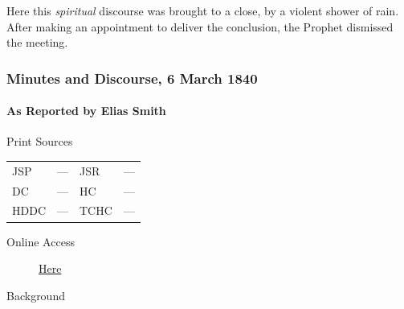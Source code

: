 				Here this \textit{spiritual} discourse was brought to a close, by a violent shower of rain. After making an appointment to deliver the conclusion, the Prophet dismissed the meeting.
				
		\subsubsection{Minutes and Discourse, 6 March 1840}
			\label{EMS-1840-JS-6-MAR-1840}
			
			\paragraph{As Reported by Elias Smith}
				\label{EMS-1840-JS-6-MAR-1840-ES}
			
				\begin{description}
					\item[Print Sources]
				\end{description}

				\begin{tabular}{p{0.5in}p{1in}p{0.5in}p{1in}}
					JSP	 	& ---		& JSR 		& --- \\
					DC	 	& ---		& HC 		& --- \\
					HDDC 	& ---		& TCHC 		& --- \\
				\end{tabular}
				
				\begin{description}
					\item[Online Access] \href{https://www.josephsmithpapers.org/paper-summary/minutes-and-discourse-6-march-1840/1}{Here}
				\end{description}
				
				\begin{description}
					\item[Background]
				\end{description}
				
				
